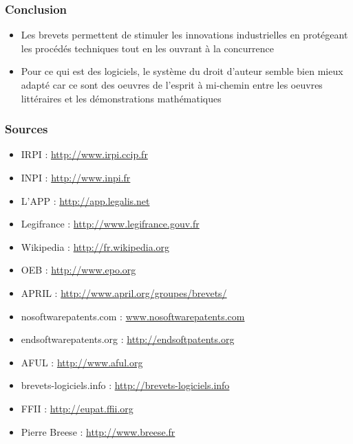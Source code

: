\documentclass{beamer}
\begin{document}
\begin{frame}
\frametitle{Conclusion}
\begin{itemize}
	\item Les brevets permettent de stimuler les innovations industrielles en protégeant les procédés techniques tout en les ouvrant à la concurrence
	\item Pour ce qui est des logiciels, le système du droit d'auteur semble bien mieux adapté car ce sont des oeuvres de l'esprit à mi-chemin entre les oeuvres littéraires et les démonstrations mathématiques
\end{itemize}
\end{frame}

\begin{frame}
\frametitle{Sources}
\begin{itemize}
	\item IRPI : \url{http://www.irpi.ccip.fr}
	\item INPI : \url{http://www.inpi.fr}
	\item L'APP : \url{http://app.legalis.net}
	\item Legifrance : \url{http://www.legifrance.gouv.fr}
	\item Wikipedia : \url{http://fr.wikipedia.org}
	\item OEB : \url{http://www.epo.org}
	\item APRIL : \url{http://www.april.org/groupes/brevets/}
	\item nosoftwarepatents.com : \url{www.nosoftwarepatents.com}
	\item endsoftwarepatents.org : \url{http://endsoftpatents.org}
	\item AFUL : \url{http://www.aful.org}
	\item brevets-logiciels.info : \url{http://brevets-logiciels.info}
	\item FFII : \url{http://eupat.ffii.org}
	\item Pierre Breese : \url{http://www.breese.fr}
\end{itemize}
\end{frame}
\end{document}
